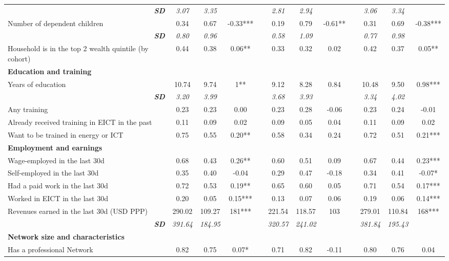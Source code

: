 \begin{landscape}
{\begin{longtable}{m{9cm}ccccccccccc}
\multicolumn{1}{r}{\textit{\textbf{SD}}}&\textit{3.07}&\textit{3.35}&&&\textit{2.81}&\textit{2.94}&&&\textit{3.06}&\textit{3.34}&\\
Number of dependent children&0.34&0.67&    -0.33***&&0.19&0.79&    -0.61**&&0.31&0.69&    -0.38***\\
\multicolumn{1}{r}{\textit{\textbf{SD}}}&\textit{0.80}&\textit{0.96}&&&\textit{0.58}&\textit{1.09}&&&\textit{0.77}&\textit{0.98}&\\
Household is in the top 2 wealth quintile (by cohort)&0.44&0.38&     0.06**&&0.33&0.32&     0.02 &&0.42&0.37&     0.05**\\
\textbf{Education and training}&&&&&&&&&&&\\
Years of education&10.74&9.74&        1**&&9.12&8.28&     0.84 &&10.48&9.50&     0.98***\\
\multicolumn{1}{r}{\textit{\textbf{SD}}}&\textit{3.20}&\textit{3.99}&&&\textit{3.68}&\textit{3.93}&&&\textit{3.34}&\textit{4.02}&\\
Any training&0.23&0.23&     0.00 &&0.23&0.28&    -0.06 &&0.23&0.24&    -0.01 \\
Already received training in EICT in the past&0.11&0.09&     0.02 &&0.09&0.05&     0.04 &&0.11&0.09&     0.02 \\
Want to be trained in energy or ICT&0.75&0.55&     0.20**&&0.58&0.34&     0.24 &&0.72&0.51&     0.21***\\
\textbf{Employment and earnings}&&&&&&&&&&&\\
Wage-employed in the last 30d&0.68&0.43&     0.26**&&0.60&0.51&     0.09 &&0.67&0.44&     0.23***\\
Self-employed in the last 30d&0.35&0.40&    -0.04 &&0.29&0.47&    -0.18 &&0.34&0.41&    -0.07*\\
Had a paid work in the last 30d&0.72&0.53&     0.19**&&0.65&0.60&     0.05 &&0.71&0.54&     0.17***\\
Worked in EICT in the last 30d&0.20&0.05&     0.15***&&0.13&0.07&     0.06 &&0.19&0.06&     0.14***\\
Revenues earned in the last 30d (USD PPP)&290.02&109.27&      181***&&221.54&118.57&      103 &&279.01&110.84&      168***\\
\multicolumn{1}{r}{\textit{\textbf{SD}}}&\textit{391.64}&\textit{184.95}&&&\textit{320.57}&\textit{241.02}&&&\textit{381.84}&\textit{195.43}&\\
\textbf{Network size and characteristics}&&&&&&&&&&&\\
Has a professional Network&0.82&0.75&     0.07*&&0.71&0.82&    -0.11 &&0.80&0.76&     0.04 \\

\end{longtable}}
\end{landscape}

